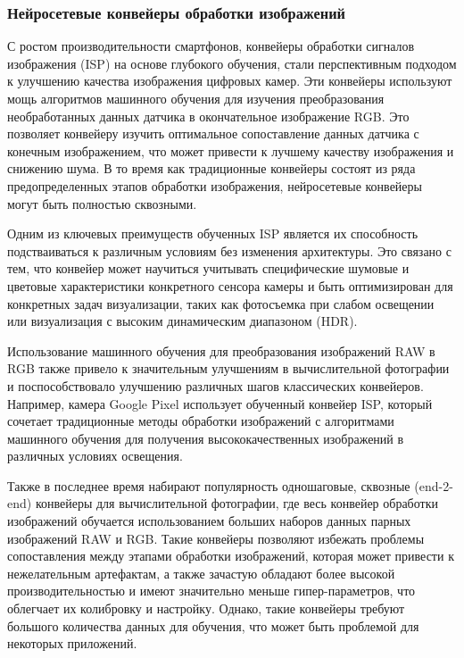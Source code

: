\subsubsection{Нейросетевые конвейеры обработки изображений}\label{sect-1-2-2}

С ростом производительности смартфонов, конвейеры обработки сигналов изображения (ISP) на основе глубокого обучения, стали перспективным подходом к улучшению качества изображения цифровых камер. Эти конвейеры используют мощь алгоритмов машинного обучения для изучения преобразования необработанных данных датчика в окончательное изображение RGB. Это позволяет конвейеру изучить оптимальное сопоставление данных датчика с конечным изображением, что может привести к лучшему качеству изображения и снижению шума. В то время как традиционные конвейеры состоят из ряда предопределенных этапов обработки изображения, нейросетевые конвейеры могут быть полностью сквозными. 

Одним из ключевых преимуществ обученных ISP является их способность подстваиваться к различным условиям без изменения архитектуры. Это связано с тем, что конвейер может научиться учитывать специфические шумовые и цветовые характеристики конкретного сенсора камеры и быть оптимизирован для конкретных задач визуализации, таких как фотосъемка при слабом освещении или визуализация с высоким динамическим диапазоном (HDR).

Использование машинного обучения для преобразования изображений RAW в RGB также привело к значительным улучшениям в вычислительной фотографии и поспособствовало улучшению различных шагов классических конвейеров. Например, камера Google Pixel использует обученный конвейер ISP, который сочетает традиционные методы обработки изображений с алгоритмами машинного обучения для получения высококачественных изображений в различных условиях освещения.

Также в последнее время набирают популярность одношаговые, сквозные (end-2-end) конвейеры для вычислительной фотографии, где весь конвейер обработки изображений обучается использованием больших наборов данных парных изображений RAW и RGB. Такие конвейеры позволяют избежать проблемы сопоставления между этапами обработки изображений, которая может привести к нежелательным артефактам, а также зачастую обладают более высокой производительностью и имеют значительно меньше гипер-параметров, что облегчает их колибровку и настройку. Однако, такие конвейеры требуют большого количества данных для обучения, что может быть проблемой для некоторых приложений.


